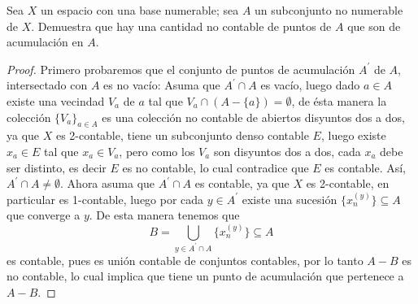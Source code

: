 
\item Sea $X$ un espacio con una base numerable; sea $A$ un subconjunto no numerable de $X$. Demuestra que hay una cantidad no contable de puntos de $A$ que son de acumulación en $A$.

\begin{proof}
    Primero probaremos que el conjunto de puntos de acumulación $A^\prime$ de $A$, intersectado con $A$ es no vacío: Asuma que $A^\prime \cap A$ es vacío, luego dado $a \in A$
    existe una vecindad $V_a$ de $a$ tal que $V_a \cap (A - \{a\}) = \emptyset$, de ésta manera la colección $\{V_a\}_{a \in A}$ es una colección no contable de abiertos disyuntos dos a dos, ya que $X$ es 2-contable, tiene un subconjunto denso contable $E$, luego existe $x_a \in E$ tal que $x_a \in V_a$, pero como los $V_a$ son disyuntos dos a dos, cada $x_a$ debe ser distinto, es decir $E$ es no contable, lo cual contradice que $E$ es contable. Así, $A^\prime \cap A \neq \emptyset$.
    Ahora asuma que $A^\prime \cap A$ es contable, ya que $X$ es 2-contable, en particular es 1-contable, luego por cada $y \in A^\prime$ existe una sucesión $\{x_n^{(y)}\}  \subseteq A$ que converge a $y$. De esta manera tenemos que
    \begin{equation*}
        B = \bigcup_{y \in A^\prime \cap A} \{x_n^{(y)}\} \subseteq A
    \end{equation*}
    es contable, pues es unión contable de conjuntos contables, por lo tanto $A - B$ es no contable, lo cual implica que tiene un punto de acumulación que pertenece a $A -B$.
\end{proof}